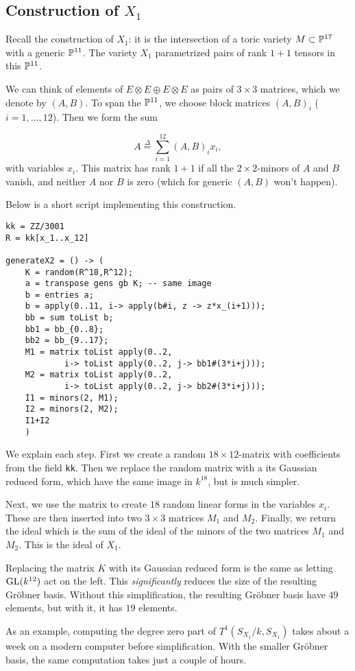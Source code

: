 \subsection{Construction of $X_1$}

Recall the construction of $X_1$: it is the intersection of a toric variety $M \subset \P^{17}$ with a generic $\P^{11}$. The variety $X_1$ parametrized pairs of rank $1+1$ tensors in this $\P^{11}$.

We can think of elements of $E \otimes E \oplus E \otimes E$ as pairs of $3 \times 3$ matrices, which we denote by $(A,B)$. To span the $\P^{11}$, we choose block matrices $\left(A,B\right)_i$ ($i=1,\ldots,12$). Then we form the sum

\[
A \stackrel \Delta = \sum_{i=1}^{12} (A,B)_i x_i,
\]
with variables $x_i$. This matrix has rank $1+1$ if all the $2 \times 2$-minors of $A$ and $B$ vanish, and neither $A$ nor $B$ is zero (which for generic $(A,B)$ won't happen). 

Below is a short \MM script implementing this construction.

\begin{lstlisting}[caption = Code for $X_1$, language=Macaulay2]
kk = ZZ/3001
R = kk[x_1..x_12]

generateX2 = () -> (
    K = random(R^18,R^12);
    a = transpose gens gb K; -- same image
    b = entries a;
    b = apply(0..11, i-> apply(b#i, z -> z*x_(i+1)));
    bb = sum toList b;
    bb1 = bb_{0..8};
    bb2 = bb_{9..17};
    M1 = matrix toList apply(0..2,
            i-> toList apply(0..2, j-> bb1#(3*i+j)));
    M2 = matrix toList apply(0..2,
            i-> toList apply(0..2, j-> bb2#(3*i+j)));
    I1 = minors(2, M1);
    I2 = minors(2, M2);
    I1+I2
    )
\end{lstlisting}

We explain each step. First we create a random $18 \times 12$-matrix with coefficients from the field \texttt{kk}. Then we replace the random matrix with a its Gaussian reduced form, which have the same image in $k^{18}$, but is much simpler.

Next, we use the matrix to create $18$ random linear forms in the variables $x_i$. These are then inserted into two $3 \times 3$ matrices $M_1$ and $M_2$. Finally, we return the ideal which is the sum of the ideal of the minors of the two matrices $M_1$ and $M_2$. This is the ideal of $X_1$.



\begin{remark}
Replacing the matrix $K$ with its Gaussian reduced form is the same as letting $\GL(k^{12})$ act on the left. This \emph{significantly} reduces the size of the resulting Gröbner basis. Without this simplification, the resulting Gröbner basis have $49$ elements, but with it, it has $19$ elements.

As an example, computing the degree zero part of $T^1(S_{X_1}/k,S_{X_1})$ takes about a week on a modern computer before simplification. With the smaller Gröbner basis, the same computation takes just a couple of hours.
\end{remark}

